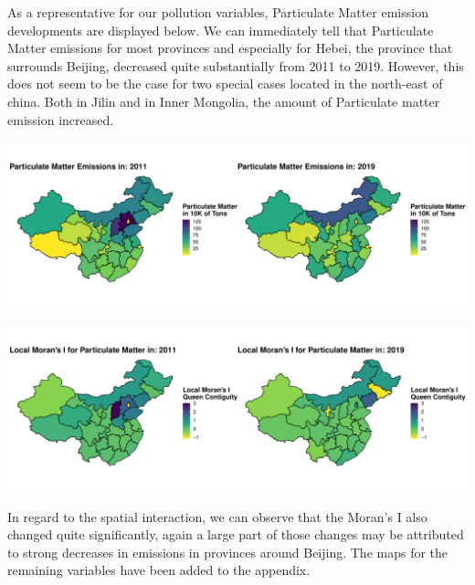 \documentclass[
]{article}
\begin{document}
	As a representative for our pollution variables, Particulate Matter emission developments are displayed below. We can immediately tell that Particulate Matter emissions for most provinces and especially for Hebei, the province that surrounds Beijing, decreased quite substantially from 2011 to 2019. However, this does not seem to be the case for two special cases located in the north-east of china. Both in Jilin and in Inner Mongolia, the amount of Particulate matter emission increased.
	\begin{center}
		\includegraphics[width = 440pt]{Waste_Gas_Emissions_Particular_Matter_comp.pdf}
	\end{center}
	\begin{center}
		\includegraphics[width = 440pt]{Ii_Waste_Gas_Emissions_Particular_Matter_comp.pdf}
	\end{center}
	In regard to the spatial interaction, we can observe that the Moran's I also changed quite significantly, again a large part of those changes may be attributed to strong decreases in emissions in provinces around Beijing. The maps for the remaining variables have been added to the appendix.
\end{document}
